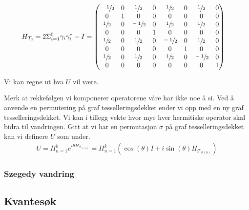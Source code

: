         \begin{align*}
            H_{\mathcal{T}_3} & = 2\Sigma_{i=1}^5\gamma_i\gamma_i^*-I = \begin{pmatrix}
                \sfrac{-1}{2} & 0 & \sfrac{1}{2} & 0 & \sfrac{1}{2} & 0 & \sfrac{1}{2} & 0 \\
                0 & 1 & 0 & 0 & 0 & 0 & 0 & 0 \\
                \sfrac{1}{2} & 0 & \sfrac{-1}{2} & 0 & \sfrac{1}{2} & 0 & \sfrac{1}{2} & 0 \\
                0 & 0 & 0 & 1 & 0 & 0 & 0 & 0 \\
                \sfrac{1}{2} & 0 & \sfrac{1}{2} & 0 & \sfrac{-1}{2} & 0 & \sfrac{1}{2} & 0 \\
                0 & 0 & 0 & 0 & 0 & 1 & 0 & 0 \\
                \sfrac{1}{2} & 0 & \sfrac{1}{2} & 0 & \sfrac{1}{2} & 0 & \sfrac{-1}{2} & 0 \\
                0 & 0 & 0 & 0 & 0 & 0 & 0 & 1
            \end{pmatrix}
        \end{align*}

        Vi kan regne ut hva $U$ vil være.

        Merk at rekkefølgen vi komponerer operatorene våre har ikke noe å si. Ved å anvende en permutering på graf tesselleringsdekket ender vi opp med en ny graf tesselleringsdekket. Vi kan i tillegg vekte hvor mye hver hermitiske operator skal bidra til vandringen. Gitt at vi har en permutasjon $\sigma$ på graf tesselleringsdekket kan vi definere $U$ som under.
        \begin{align*}
            U=\Pi_{n=1}^ke^{i\theta H_{\mathcal{T}_{\sigma(n)}}}=\Pi_{n=1}^k(\cos(\theta)I+i\sin(\theta)H_{\mathcal{T}_{\sigma(n)}})
        \end{align*}

    \subsubsection*{Szegedy vandring}

\subsection{Kvantesøk}